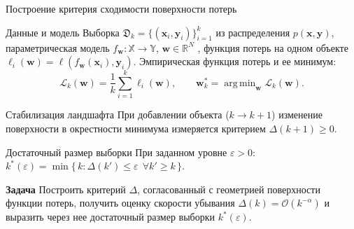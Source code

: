 \documentclass{beamer}
\DeclareMathOperator*{\argmin}{arg\,min}
\begin{document}
\begin{frame}{Построение критерия сходимости поверхности потерь}
    \vspace{-0.4em}
    \begin{block}{Данные и модель}
        Выборка $\mathfrak{D}_k = \{(\mathbf{x}_i, \mathbf{y}_i)\}_{i=1}^{k}$ из распределения $p(\mathbf{x}, \mathbf{y})$, параметрическая модель $f_{\mathbf{w}}: \mathbb{X} \to \mathbb{Y}$, $\mathbf{w} \in \mathbb{R}^{N}$ , функция потерь на одном объекте $\ell_i(\mathbf{w}) = \ell(f_{\mathbf{w}}(\mathbf{x}_i), \mathbf{y}_i)$. Эмпирическая функция потерь и ее минимум:
        \vspace{-1.0em}
        \[
            \mathcal{L}_k(\mathbf{w}) = \frac{1}{k}\sum_{i=1}^{k} \ell_i(\mathbf{w}),
            \qquad
            \mathbf{w}_k^* = \argmin_{\mathbf{w}} \mathcal{L}_k(\mathbf{w}).
        \]
    \end{block}
    \vspace{-1.6em}
    \begin{block}{Стабилизация ландшафта}
        При добавлении объекта ($k \to k+1$) изменение поверхности в окрестности минимума измеряется критерием $\Delta(k+1) \geqslant 0$.
    \end{block}
    \begin{block}{Достаточный размер выборки}
        При заданном уровне $\varepsilon > 0$: $k^*(\varepsilon) = \min\{\, k : \Delta(k') \leqslant \varepsilon \ \ \forall k' \geqslant k \,\}$.
    \end{block}
    \begin{alertblock}{\textbf{Задача}}
        Построить критерий $\Delta$, согласованный с геометрией поверхности функции потерь, получить оценку скорости убывания $\Delta(k) = \mathcal{O}(k^{-\alpha})$ и выразить через нее достаточный размер выборки $k^*(\varepsilon)$.
    \end{alertblock}
\end{frame}
\end{document}

